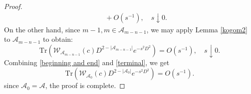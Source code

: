 \begin{proof}
\begin{align}
                                                        &\quad+O(s^{-1}),\quad s\downarrow0.
        \end{align}
        On the other hand, since $m-1,m \in \mathscr{A}_{m-n-1}$, we may apply Lemma \ref{kogom2} to $\mathscr{A}_{m-n-1}$ to obtain:
        \begin{equation*}\label{terminal}
            \mathrm{Tr}(\mathcal{W}_{\mathscr{A}_{m-n-1}}(c)D^{2-|\mathscr{A}_{m-n-1}|}e^{-s^2D^2}) = O(s^{-1}),\quad s\downarrow0.
        \end{equation*}
        Combining \eqref{beginning and end} and \eqref{terminal}, we get
        \begin{equation*}
            \mathrm{Tr}(\mathcal{W}_{\mathscr{A}_0}(c)D^{2-|\mathscr{A}_0|}e^{-s^2D^2}) = O(s^{-1}).
        \end{equation*}
        since $\mathscr{A}_0 = \mathscr{A}$, the proof is complete.
    \end{proof}
    

